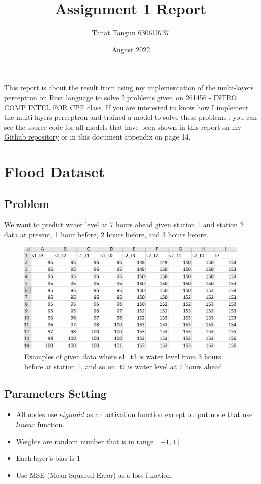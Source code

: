 \documentclass{article}
\title{Assignment 1 Report}
\author{Tanat Tangun 630610737}
\date{August 2022}
\begin{document}
\maketitle

This report is about the result from using my implementation of the multi-layers perceptron
on Rust language to solve 2 problems given on 261456 - INTRO COMP INTEL FOR CPE class. 
If you are interested to know how I implement the multi-layers perceptron and trained a model to solve these problems
, you can see the source code for all models that have been shown in this report on my 
\href{https://github.com/RiwEZ/MLPOnRust}{Github repository} or in this document appendix on page 14.

\section*{Flood Dataset}
\label{section:1}
\subsection*{Problem}
We want to predict water level at 7 hours ahead given station 1 and station 2 
data at present, 1 hour before, 2 hours before, and 3 hours before. 
\begin{figure}[ht]
	\includegraphics[width=\textwidth]{flood_data}
	\caption{Examples of given data
		where s1\_t3 is water level from 3 hours before at station 1, and so on.
		t7 is water level at 7 hours ahead.}
	\label{fig:1}
\end{figure}

\subsection*{Parameters Setting}
\begin{itemize}
	\item All nodes use $sigmoid$ as an activation function except output node that use $linear$ function.
	\item Weights are random number that is in range $[-1, 1]$
	\item Each layer's bias is $1$
	\item Use MSE (Mean Squared Error) as a loss function.
\end{itemize}
\end{document}

